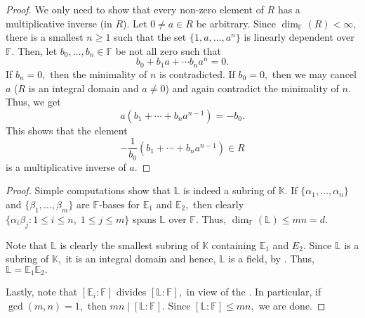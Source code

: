\intdomfinextfield*\label{prop:intdomfinextfield2}
\begin{flushright}\hyperref[prop:intdomfinextfield]{\upsym}\end{flushright}
\begin{proof}
    We only need to show that every non-zero element of $R$ has a multiplicative inverse (in $R$). Let $0 \neq a \in R$ be arbitrary. Since $\dim_{\mathbb{F}}(R) < \infty,$ there is a smallest $n \ge 1$ such that the set $\{1, a, \ldots, a^n\}$ is linearly dependent over $\mathbb{F}.$ Then, let $b_0, \ldots, b_{n} \in \mathbb{F}$ be not all zero such that
    \begin{equation*} 
        b_0 + b_1a + \cdots b_na^n = 0.
    \end{equation*} 
    If $b_n = 0,$ then the minimality of $n$ is contradicted. If $b_0 = 0,$ then we may cancel $a$ ($R$ is an integral domain and $a \neq 0$) and again contradict the minimality of $n.$ Thus, we get
    \begin{equation*} 
        a(b_1 + \cdots + b_na^{n - 1}) = -b_0.
    \end{equation*}
    This shows that the element
    \begin{equation*} 
        -\frac{1}{b_0}(b_1 + \cdots + b_na^{n - 1}) \in R
    \end{equation*}
    is a multiplicative inverse of $a.$
\end{proof}

\descofcompositum*\label{prop:descofcompositum2}
\begin{flushright}\hyperref[prop:descofcompositum]{\upsym}\end{flushright}
\begin{proof}
    Simple computations show that $\mathbb{L}$ is indeed a subring of $\mathbb{K}.$ If $\{\alpha_1, \ldots, \alpha_n\}$ and $\{\beta_1, \ldots, \beta_m\}$ are $\mathbb{F}$-bases for $\mathbb{E}_1$ and $\mathbb{E}_2,$ then clearly $\{\alpha_i\beta_j : 1 \le i \le n,\; 1 \le j \le m\}$ spans $\mathbb{L}$ over $\mathbb{F}.$ Thus, $\dim_{\mathbb{F}}(\mathbb{L}) \le mn = d.$ 

    Note that $\mathbb{L}$ is clearly the smallest subring of $\mathbb{K}$ containing $\mathbb{E}_1$ and $E_2.$ Since $\mathbb{L}$ is a subring of $\mathbb{K},$ it is an integral domain and hence, $\mathbb{L}$ is a field, by . Thus, $\mathbb{L} = \mathbb{E}_1\mathbb{E}_2.$

    Lastly, note that $[\mathbb{E}_i : \mathbb{F}]$ divides $[\mathbb{L} : \mathbb{F}],$ in view of the . In particular, if $\gcd(m, n) = 1,$ then $mn \mid [\mathbb{L} : \mathbb{F}].$ Since $[\mathbb{L} : \mathbb{F}] \le mn,$ we are done.
\end{proof}


